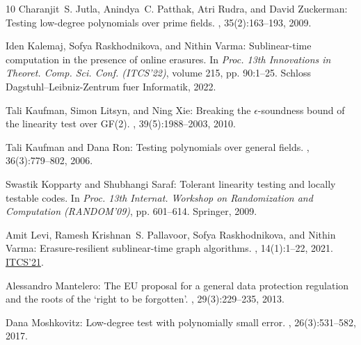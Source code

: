 \documentclass[11pt]{article}
\numberwithin{equation}{section}
\theoremstyle{definition}
\theoremstyle{plain}
\begin{document}
\begin{thebibliography}{10}
{\sc Charanjit~S. Jutla, Anindya~C. Patthak, Atri Rudra, and David Zuckerman}:
  Testing low-degree polynomials over prime fields.
, 35(2):163--193, 2009.

{\sc Iden Kalemaj, Sofya Raskhodnikova, and Nithin Varma}: Sublinear-time
  computation in the presence of online erasures.
\newblock In {\em Proc. 13th Innovations in Theoret. Comp. Sci. Conf.
  (ITCS'22)}, volume 215, pp. 90:1--25. Schloss Dagstuhl--Leibniz-Zentrum fuer
  Informatik, 2022.

{\sc Tali Kaufman, Simon Litsyn, and Ning Xie}: Breaking the
  $\epsilon$-soundness bound of the linearity test over {GF(2)}.
, 39(5):1988--2003, 2010.
\newblock [\epfmtdoi{10.1137/080715548}]

{\sc Tali Kaufman and Dana Ron}: Testing polynomials over general fields.
, 36(3):779--802, 2006.
\newblock [\epfmtdoi{10.1137/S0097539704445615}]

{\sc Swastik Kopparty and Shubhangi Saraf}: Tolerant linearity testing and
  locally testable codes.
\newblock In {\em Proc. 13th Internat. Workshop on Randomization and
  Computation (RANDOM'09)}, pp. 601--614. Springer, 2009.
\newblock [\epfmtdoi{10.1007/978-3-642-03685-9\_45}]

{\sc Amit Levi, Ramesh Krishnan~S. Pallavoor, Sofya Raskhodnikova, and Nithin
  Varma}: Erasure-resilient sublinear-time graph algorithms.
, 14(1):1--22, 2021.
\newblock \prelim \href{https://doi.org/10.4230/LIPIcs.ITCS.2021.80}{ITCS'21}.
\newblock [\epfmtdoi{10.1145/3488250}]

{\sc Alessandro Mantelero}: The {EU} proposal for a general data protection
  regulation and the roots of the `right to be forgotten'.
, 29(3):229--235, 2013.

{\sc Dana Moshkovitz}: Low-degree test with polynomially small error.
, 26(3):531--582, 2017.
\newblock [\epfmtdoi{10.1007/s00037-016-0149-4}]


\end{thebibliography}
\end{document}

